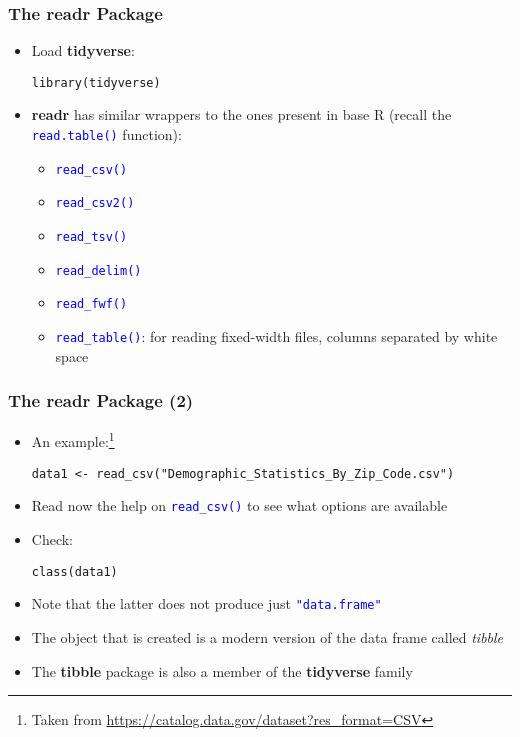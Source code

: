\documentclass[10pt]{beamer}
\newcommand{\cc}[1]{\texttt{\textcolor{blue}{#1}}}
\theoremstyle{definition}
\begin{document}
\begin{frame}[fragile]
\frametitle{The \textbf{readr} Package}
\begin{itemize}
	\item Load \textbf{tidyverse}:
	\begin{lstlisting}[style = rstyle]
	library(tidyverse)
	\end{lstlisting}
	\item \textbf{readr} has similar wrappers to the ones present in base R (recall the \cc{read.table()} function):
	\begin{itemize}
		\item \cc{read\_csv()}
		\item \cc{read\_csv2()}
		\item \cc{read\_tsv()}
		\item \cc{read\_delim()}
		\item \cc{read\_fwf()}
		\item \cc{read\_table()}: for reading fixed-width files, columns separated by white space
	\end{itemize}
\end{itemize}
\end{frame}

\begin{frame}[fragile]
\frametitle{The \textbf{readr} Package (2)}
\begin{itemize}
	\item An example:\footnote{Taken from \url{https://catalog.data.gov/dataset?res_format=CSV}}
	\begin{lstlisting}[style = rstyle, breaklines]
	data1 <- read_csv("Demographic_Statistics_By_Zip_Code.csv")
	\end{lstlisting}
	\item Read now the help on \cc{read\_csv()} to see what options are available
	\item Check:
	\begin{lstlisting}[style = rstyle, breaklines]
	class(data1)
	\end{lstlisting}
	\item Note that the latter does not produce just \cc{"data.frame"}
	\item The object that is created is a modern version of the data frame called \textit{tibble}
	\item The \textbf{tibble} package is also a member of the \textbf{tidyverse} family
\end{itemize}
\end{frame}
\end{document}
